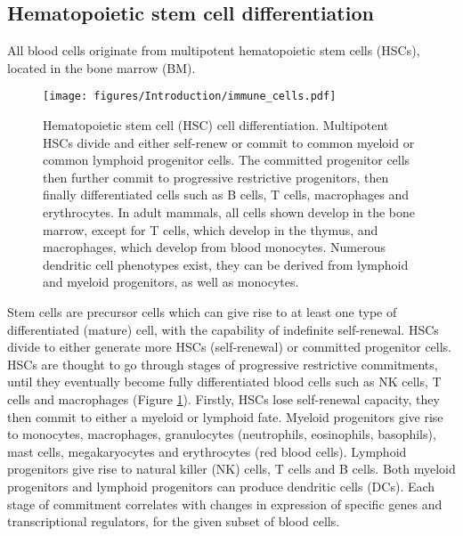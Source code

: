 \subsection{Hematopoietic stem cell differentiation}
All blood cells originate from multipotent hematopoietic stem cells (HSCs), located in the bone marrow (BM).
%
\begin{figure}[htb]
\centering\texttt{[image: figures/Introduction/immune\_cells.pdf]}
\caption[Hematopoietic system cell differentiation]{Hematopoietic stem cell (HSC) cell differentiation.
Multipotent HSCs divide and either self-renew or commit to common myeloid or common lymphoid progenitor cells.
The committed progenitor cells then further commit to progressive restrictive progenitors, then finally differentiated cells such as B cells, T cells, macrophages and erythrocytes.
In adult mammals, all cells shown develop in the bone marrow, except for T cells, which develop in the thymus, and macrophages, which develop from blood monocytes.
Numerous dendritic cell phenotypes exist, they can be derived from lymphoid and myeloid progenitors, as well as monocytes.}
\label{fig:HSC_differentiation}\end{figure}
Stem cells are precursor cells which can give rise to at least one type of differentiated (mature) cell, with the capability of indefinite self-renewal.
HSCs divide to either generate more HSCs (self-renewal) or committed progenitor cells.
HSCs are thought to go through stages of progressive restrictive commitments, until they eventually become fully differentiated blood cells such as NK cells, T cells and macrophages (Figure \ref{fig:HSC_differentiation}).
Firstly, HSCs lose self-renewal capacity, they then commit to either a myeloid or lymphoid fate.
Myeloid progenitors give rise to monocytes, macrophages, granulocytes (neutrophils, eosinophils, basophils), mast cells, megakaryocytes and erythrocytes (red blood cells).
Lymphoid progenitors give rise to natural killer (NK) cells, T cells and B cells.
Both myeloid progenitors and lymphoid progenitors can produce dendritic cells (DCs)\cite{alberts2007molecularstem}.
Each stage of commitment correlates with changes in expression of specific genes and transcriptional regulators, for the given subset of blood cells\cite{seita2010hematopoietic}.

